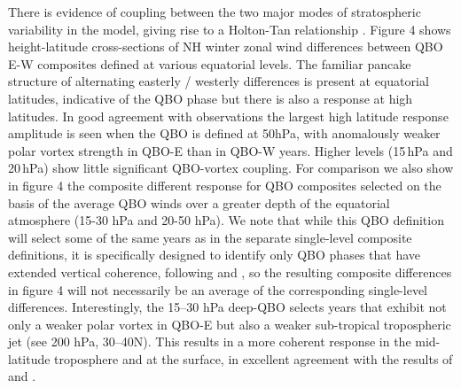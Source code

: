 There is evidence of coupling between the two major modes of stratospheric variability in the model, giving rise to a Holton-Tan relationship \citep{Anstey20}. Figure 4 shows height-latitude cross-sections of NH winter zonal wind differences between QBO E-W composites defined at various equatorial levels. The familiar pancake structure of alternating easterly / westerly differences is present at equatorial latitudes, indicative of the QBO phase but there is also a response at high latitudes. In good agreement with observations the largest high latitude response amplitude is seen when  the QBO is defined at 50hPa, with anomalously weaker polar vortex strength in QBO-E than in QBO-W years. Higher levels (15\,hPa and 20\,hPa) show little significant QBO-vortex coupling. For comparison we also show in figure 4 the composite different response for QBO composites selected on the basis of the average QBO winds over a greater depth of the equatorial atmosphere (15-30 hPa and 20-50 hPa). We note that while this QBO definition will select some of the same years as in the separate single-level composite definitions, it is specifically designed to identify only QBO  phases that have extended vertical coherence, following \citep{Gray2018} and \cite{Andrews2019}, so the resulting composite  differences in figure 4 will not necessarily be an average of the corresponding single-level differences.   Interestingly, the 15--30 hPa deep-QBO selects years that exhibit not only a weaker polar vortex in QBO-E but also a weaker sub-tropical tropospheric jet (see 200 hPa, 30--40N). This results in a more coherent response in the mid-latitude troposphere and at the surface, in excellent agreement with the results of \cite{Gray2018} and \cite{Andrews2019}. 


